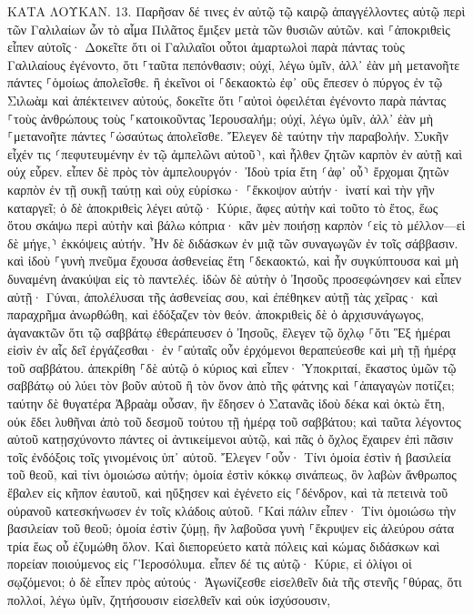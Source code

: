 \documentclass[twoside, 9pt]{extreport}
\begin{document}
ΚΑΤΑ ΛΟΥΚΑΝ.
13.
Παρῆσαν δέ τινες ἐν αὐτῷ τῷ καιρῷ ἀπαγγέλλοντες αὐτῷ περὶ τῶν Γαλιλαίων ὧν τὸ αἷμα Πιλᾶτος ἔμιξεν μετὰ τῶν θυσιῶν αὐτῶν. 
καὶ ⸀ἀποκριθεὶς εἶπεν αὐτοῖς· Δοκεῖτε ὅτι οἱ Γαλιλαῖοι οὗτοι ἁμαρτωλοὶ παρὰ πάντας τοὺς Γαλιλαίους ἐγένοντο, ὅτι ⸀ταῦτα πεπόνθασιν; 
οὐχί, λέγω ὑμῖν, ἀλλ᾽ ἐὰν μὴ μετανοῆτε πάντες ⸀ὁμοίως ἀπολεῖσθε. 
ἢ ἐκεῖνοι οἱ ⸀δεκαοκτὼ ἐφ᾽ οὓς ἔπεσεν ὁ πύργος ἐν τῷ Σιλωὰμ καὶ ἀπέκτεινεν αὐτούς, δοκεῖτε ὅτι ⸀αὐτοὶ ὀφειλέται ἐγένοντο παρὰ πάντας ⸀τοὺς ἀνθρώπους τοὺς ⸀κατοικοῦντας Ἰερουσαλήμ; 
οὐχί, λέγω ὑμῖν, ἀλλ᾽ ἐὰν μὴ ⸀μετανοῆτε πάντες ⸀ὡσαύτως ἀπολεῖσθε. 
Ἔλεγεν δὲ ταύτην τὴν παραβολήν. Συκῆν εἶχέν τις ⸂πεφυτευμένην ἐν τῷ ἀμπελῶνι αὐτοῦ⸃, καὶ ἦλθεν ζητῶν καρπὸν ἐν αὐτῇ καὶ οὐχ εὗρεν. 
εἶπεν δὲ πρὸς τὸν ἀμπελουργόν· Ἰδοὺ τρία ἔτη ⸂ἀφ᾽ οὗ⸃ ἔρχομαι ζητῶν καρπὸν ἐν τῇ συκῇ ταύτῃ καὶ οὐχ εὑρίσκω· ⸀ἔκκοψον αὐτήν· ἱνατί καὶ τὴν γῆν καταργεῖ; 
ὁ δὲ ἀποκριθεὶς λέγει αὐτῷ· Κύριε, ἄφες αὐτὴν καὶ τοῦτο τὸ ἔτος, ἕως ὅτου σκάψω περὶ αὐτὴν καὶ βάλω κόπρια· 
κἂν μὲν ποιήσῃ καρπὸν ⸂εἰς τὸ μέλλον—εἰ δὲ μήγε,⸃ ἐκκόψεις αὐτήν. 
Ἦν δὲ διδάσκων ἐν μιᾷ τῶν συναγωγῶν ἐν τοῖς σάββασιν. 
καὶ ἰδοὺ ⸀γυνὴ πνεῦμα ἔχουσα ἀσθενείας ἔτη ⸀δεκαοκτώ, καὶ ἦν συγκύπτουσα καὶ μὴ δυναμένη ἀνακύψαι εἰς τὸ παντελές. 
ἰδὼν δὲ αὐτὴν ὁ Ἰησοῦς προσεφώνησεν καὶ εἶπεν αὐτῇ· Γύναι, ἀπολέλυσαι τῆς ἀσθενείας σου, 
καὶ ἐπέθηκεν αὐτῇ τὰς χεῖρας· καὶ παραχρῆμα ἀνωρθώθη, καὶ ἐδόξαζεν τὸν θεόν. 
ἀποκριθεὶς δὲ ὁ ἀρχισυνάγωγος, ἀγανακτῶν ὅτι τῷ σαββάτῳ ἐθεράπευσεν ὁ Ἰησοῦς, ἔλεγεν τῷ ὄχλῳ ⸀ὅτι Ἓξ ἡμέραι εἰσὶν ἐν αἷς δεῖ ἐργάζεσθαι· ἐν ⸀αὐταῖς οὖν ἐρχόμενοι θεραπεύεσθε καὶ μὴ τῇ ἡμέρᾳ τοῦ σαββάτου. 
ἀπεκρίθη ⸀δὲ αὐτῷ ὁ κύριος καὶ εἶπεν· Ὑποκριταί, ἕκαστος ὑμῶν τῷ σαββάτῳ οὐ λύει τὸν βοῦν αὐτοῦ ἢ τὸν ὄνον ἀπὸ τῆς φάτνης καὶ ⸀ἀπαγαγὼν ποτίζει; 
ταύτην δὲ θυγατέρα Ἀβραὰμ οὖσαν, ἣν ἔδησεν ὁ Σατανᾶς ἰδοὺ δέκα καὶ ὀκτὼ ἔτη, οὐκ ἔδει λυθῆναι ἀπὸ τοῦ δεσμοῦ τούτου τῇ ἡμέρᾳ τοῦ σαββάτου; 
καὶ ταῦτα λέγοντος αὐτοῦ κατῃσχύνοντο πάντες οἱ ἀντικείμενοι αὐτῷ, καὶ πᾶς ὁ ὄχλος ἔχαιρεν ἐπὶ πᾶσιν τοῖς ἐνδόξοις τοῖς γινομένοις ὑπ᾽ αὐτοῦ. 
Ἔλεγεν ⸀οὖν· Τίνι ὁμοία ἐστὶν ἡ βασιλεία τοῦ θεοῦ, καὶ τίνι ὁμοιώσω αὐτήν; 
ὁμοία ἐστὶν κόκκῳ σινάπεως, ὃν λαβὼν ἄνθρωπος ἔβαλεν εἰς κῆπον ἑαυτοῦ, καὶ ηὔξησεν καὶ ἐγένετο εἰς ⸀δένδρον, καὶ τὰ πετεινὰ τοῦ οὐρανοῦ κατεσκήνωσεν ἐν τοῖς κλάδοις αὐτοῦ. 
⸀Καὶ πάλιν εἶπεν· Τίνι ὁμοιώσω τὴν βασιλείαν τοῦ θεοῦ; 
ὁμοία ἐστὶν ζύμῃ, ἣν λαβοῦσα γυνὴ ⸀ἔκρυψεν εἰς ἀλεύρου σάτα τρία ἕως οὗ ἐζυμώθη ὅλον. 
Καὶ διεπορεύετο κατὰ πόλεις καὶ κώμας διδάσκων καὶ πορείαν ποιούμενος εἰς ⸀Ἱεροσόλυμα. 
εἶπεν δέ τις αὐτῷ· Κύριε, εἰ ὀλίγοι οἱ σῳζόμενοι; ὁ δὲ εἶπεν πρὸς αὐτούς· 
Ἀγωνίζεσθε εἰσελθεῖν διὰ τῆς στενῆς ⸀θύρας, ὅτι πολλοί, λέγω ὑμῖν, ζητήσουσιν εἰσελθεῖν καὶ οὐκ ἰσχύσουσιν, 
\end{document}
